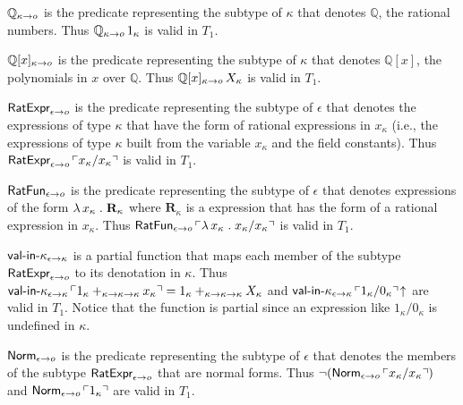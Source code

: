 \documentclass[fleqn]{llncs}
\newcommand{\QQ}{\ensuremath{\mathbb{Q}}}
\begin{document}
\be

  \item $\QQ_{\kappa \tarrow o}$ is the predicate representing the
    subtype of $\kappa$ that denotes $\QQ$, the rational numbers.
    Thus $\QQ_{\kappa \tarrow o} \, 1_\kappa$ is valid in $T_1$.

  \item $\QQ[x]_{\kappa \tarrow o}$ is the predicate representing the
    subtype of $\kappa$ that denotes $\QQ[x]$, the polynomials in $x$
    over $\QQ$.  Thus $\QQ[x]_{\kappa \tarrow o} \, X_\kappa$ is valid
    in $T_1$.

  \item $\mbox{\sf RatExpr}_{\epsilon \rightarrow o}$ is the predicate
    representing the subtype of $\epsilon$ that denotes the
    expressions of type $\kappa$ that have the form of rational
    expressions in $x_\kappa$ (i.e., the expressions of type $\kappa$
    built from the variable $x_\kappa$ and the field constants).  Thus
    $\mbox{\sf RatExpr}_{\epsilon \rightarrow o} \,
    \ulcorner x_\kappa/x_\kappa\urcorner$ is valid in $T_1$.

  \item $\mbox{\sf RatFun}_{\epsilon \rightarrow o}$ is the predicate
    representing the subtype of $\epsilon$ that denotes expressions of
    the form $\lambda\, x_\kappa \mathrel. \textbf{R}_\kappa$ where
    $\textbf{R}_\kappa$ is a expression that has the form of a
    rational expression in $x_\kappa$.  Thus $\mbox{\sf RatFun}_{\epsilon
      \rightarrow o} \, \ulcorner\lambda\, x_\kappa \mathrel.
      x_\kappa/x_\kappa\urcorner$ is valid in $T_1$.

  \item $\mbox{\sf val-in-}\kappa_{\epsilon \rightarrow \kappa}$ is a partial
    function that maps each member of the subtype
    $\mbox{\sf RatExpr}_{\epsilon \rightarrow o}$ to its denotation in
    $\kappa$.  Thus $\mbox{\sf val-in-}\kappa_{\epsilon \rightarrow \kappa}
    \, \ulcorner1_\kappa +_{\kappa \rightarrow \kappa \rightarrow \kappa}
      x_\kappa\urcorner = 1_\kappa +_{\kappa \rightarrow \kappa \rightarrow \kappa}
    X_\kappa$ and $\mbox{\sf val-in-}\kappa_{\epsilon \rightarrow \kappa} \,
    \ulcorner1_\kappa/0_\kappa\urcorner \!\uparrow$ are valid in $T_1$.
    Notice that the function is partial since an expression like
    $1_\kappa/0_\kappa$ is undefined in $\kappa$.

  \item \bsp $\mbox{\sf Norm}_{\epsilon \rightarrow o}$ is the predicate
    representing the subtype of $\epsilon$ that denotes the members of
    the subtype $\mbox{\sf RatExpr}_{\epsilon \rightarrow o}$ that are normal
    forms.  Thus $\neg(\mbox{\sf Norm}_{\epsilon \rightarrow o}
    \, \ulcorner x_\kappa/x_\kappa\urcorner)$ and $\mbox{\sf Norm}_{\epsilon
      \rightarrow o} \, \ulcorner1_\kappa\urcorner$ are valid in $T_1$.\esp
\end{document}
